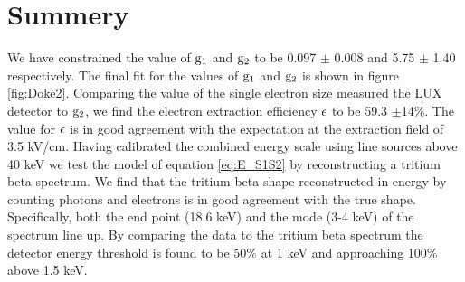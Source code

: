 \newpage

\section{Summery}

We have constrained the value of $\rm g_1$ and $\rm g_2$ to be 0.097 $\pm$ 0.008 and 5.75 $\pm$ 1.40 respectively. The final fit for the values of $\rm g_1$ and $\rm g_2$ is shown in figure \ref{fig:Doke2}. Comparing the value of the single electron size measured the LUX detector to $\rm g_2$, we find the electron extraction efficiency $\rm \epsilon$ to be  59.3 $\pm$14\%. The value for $\rm \epsilon$ is in good agreement with the expectation at the extraction field of 3.5 kV/cm. Having calibrated the combined energy scale using line sources above 40 keV we test the model of equation \ref{eq:E_S1S2} by reconstructing a tritium beta spectrum. We find that the tritium beta shape reconstructed in energy by counting photons and electrons is in good agreement with the true shape. Specifically, both the end point (18.6 keV) and the mode (3-4 keV) of the spectrum line up. By comparing the data to the tritium beta spectrum the detector energy threshold is found to be 50\% at 1 keV and approaching 100\% above 1.5 keV.


